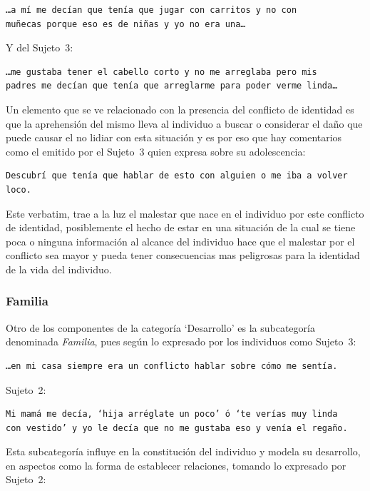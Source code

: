 \begin{verbatim}
…a mí me decían que tenía que jugar con carritos y no con
muñecas porque eso es de niñas y yo no era una…
\end{verbatim}

Y del Sujeto~3:

\begin{verbatim}
…me gustaba tener el cabello corto y no me arreglaba pero mis
padres me decían que tenía que arreglarme para poder verme linda…
\end{verbatim}

 Un elemento que se ve relacionado con la presencia del conflicto de identidad
 es que la aprehensión del mismo lleva al individuo a buscar o considerar el
 daño que puede causar el no lidiar con esta situación y es por eso que hay
 comentarios como el emitido por el Sujeto~3 quien expresa sobre su
 adolescencia:

 \begin{verbatim}
Descubrí que tenía que hablar de esto con alguien o me iba a volver loco.
 \end{verbatim}

 Este verbatim, trae a la luz el malestar que nace en el individuo por este
 conflicto de identidad, posiblemente el hecho de estar en una situación de la
 cual se tiene poca o ninguna información al alcance del individuo hace que el
 malestar por el conflicto sea mayor y pueda tener consecuencias mas peligrosas
 para la identidad de la vida del individuo.

\subsubsection{Familia}

Otro de los componentes de la categoría ‘Desarrollo’ es la subcategoría
denominada \emph{Familia}, pues según  lo expresado por los individuos como
Sujeto~3:

\begin{verbatim}
…en mi casa siempre era un conflicto hablar sobre cómo me sentía.
\end{verbatim}

Sujeto~2:

\begin{verbatim}
Mi mamá me decía, ‘hija arréglate un poco’ ó ‘te verías muy linda
con vestido’ y yo le decía que no me gustaba eso y venía el regaño.
\end{verbatim}

Esta subcategoría influye en la constitución del individuo y modela su
desarrollo, en aspectos como la forma de establecer relaciones,
tomando lo expresado por Sujeto~2:

